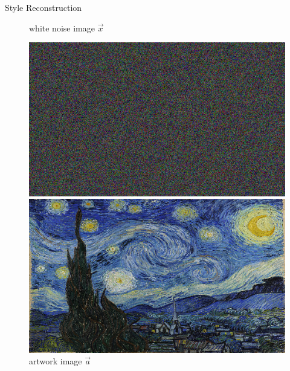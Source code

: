 \documentclass{beamer}
\begin{document}
\begin{frame}{Style Reconstruction}
\begin{figure}[ht]
    \begin{minipage}[b]{0.45\linewidth}
        \centering
        \caption{white noise image $\overrightarrow{x}$}
        \includegraphics[width=\textwidth]{img/style/noise.png}
    \end{minipage}
    \hspace{0.5cm}
    \begin{minipage}[b]{0.45\linewidth}
        \centering
        \caption{artwork image $\overrightarrow{a}$}
        \includegraphics[width=\textwidth]{img/style/starry_night.png}
    \end{minipage}
\end{figure}
\end{frame}
\end{document}
